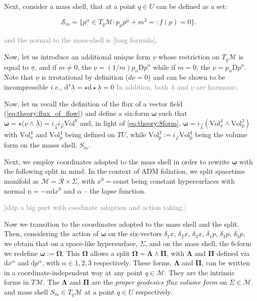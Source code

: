 \documentclass[11pt,a4paper,headinclude=true,DIV=14,BCOR=8mm,chapterprefix,listof=totoc,twoside,openright,abstracton]{scrbook}
\newcommand{\gray}[1]{\textcolor{gray}{#1}}
\begin{document}
Next, consider a mass shell, that at a point $q\in U$ can be defined as a set:

\begin{equation}
\mathcal{S}_m = \big\{ p^{\alpha}\in T_q\mathcal{M}: p_{\mu}p^{\mu}+m^2 =:f(p) = 0 \big\}.
\end{equation}

\gray{and the normal to the mass-shell is [long formula]}. 

Now, let us introduce an additional unique form $\underline{\nu}$ whose restriction on $T_q\mathcal{M}$ is equal to $\underline{\pi}$, and if $m \neq 0$, the $\underline{\nu} = (1/m) p_{\alpha}\text{D}p^{\alpha}$ while if $m = 0$, the $\underline{\nu} = p_{\alpha}\text{D}p^{\alpha}$. Note that $\underline{\nu}$ is irrotational by definition ($d\underline{\nu}=0$) and can be shown to be incompressible \textit{i.e.,} $\text{d}^{\star}\underline{\lambda} =\star \text{d}\star\underline{\lambda} =0$ \gray{In addition, both $\underline{\lambda}$ and $\underline{\nu}$ are harmonic}. 

Now, let us recall the definition of the flux of a vector field (\ref{eq:theory:flux_of_flow}) and define a six-form $\boldsymbol{\omega}$ such that $\boldsymbol{\omega} = \star\big(\underline{\nu}\wedge\underline{\lambda}\big) = i_{\vec{\lambda}} i_{\vec{\nu}}\text{Vol}^8$ and, in light of \ref{eq:theory:8form}, $\boldsymbol{\omega} = i_{\vec{\lambda}} ( \text{Vol}^{4}_{x}\wedge\text{Vol}^{3}_{p} )$ with $\text{Vol}_x ^4$ and $\text{Vol}_p ^4$ being defined on $TU$, while $\text{Vol}_p ^3 := i_{\vec{\nu}}\text{Vol}_p ^4$ being the volume form on the masss shell, $S_m$. 

Next, we employ coordinates adopted to the mass shell in order to rewrite $\boldsymbol{\omega}$ with the following split in mind. In the context of ADM foliation, we split spacetime manifold as $\mathcal{M} = \mathcal{R} \times \Sigma$, with $x^0 = \text{const}$ being constant hypersurfaces with normal $\underline{n} = - \alpha\text{d}x^0$ and $\alpha$ -- the lapse function. 

\gray{[skip a big part with coodinate adaption and action taking.]}

Now we transition to the coordinates adopted to the mass shell and the split. Then, considering the action of $\boldsymbol{\omega}$ on the six-vectors $\delta_1 x$, $\delta_2 x$, $\delta_3 x$, $\delta_1 p$, $\delta_2 p$, $\delta_3 p$, we obtain that on a space-like hypersurface, $\Sigma$, and on the mass shell, the 6-form we redefine $\boldsymbol{\omega} := \boldsymbol{\Omega}$. This $\boldsymbol{\Omega}$ allows a split $\boldsymbol{\Omega} = \boldsymbol{\Lambda} \wedge \boldsymbol{\Pi}$, with $\boldsymbol{\Lambda}$ and $\boldsymbol{\Pi}$ defined via $\text{d}x^{\alpha}$ and $\text{d}p^{\alpha}$, with $\alpha\in{1,2,3}$ respectively. These forms, $\boldsymbol{\Lambda}$ and $\boldsymbol{\Pi}$, can be written in a coordinate-independent way at any point $q\in\mathcal{M}$. They are the intrinsic forms in $T\mathcal{M}$. The $\boldsymbol{\Lambda}$ and $\boldsymbol{\Pi}$ are the \textit{proper geodesics flux volume form} on $\Sigma\in\mathcal{M}$ and mass shell $S_m\in T_q\mathcal{M}$ at a point $q\in U$ respectively.
\end{document}

